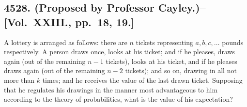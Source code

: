 \documentclass[11pt,a4paper]{book}
\begin{document}
\subsection*{4528. (Proposed by Professor Cayley.)\---[Vol.~XXIII., pp.~18, 19.]}

A lottery is arranged as follows: there are $n$ tickets representing $a,b,c,\ldots$ pounds respectively. A person draws once, looks at his ticket; and if he pleases, draws again (out of the remaining $n-1$ tickets), looks at his ticket, and if he pleases draws again (out of the remaining $n-2$ tickets); and so on, drawing in all not more than $k$ times; and he receives the value of the last drawn ticket. Supposing that he regulates his drawings in the manner most advantageous to him according to the theory of probabilities, what is the value of his expectation?
\end{document}
